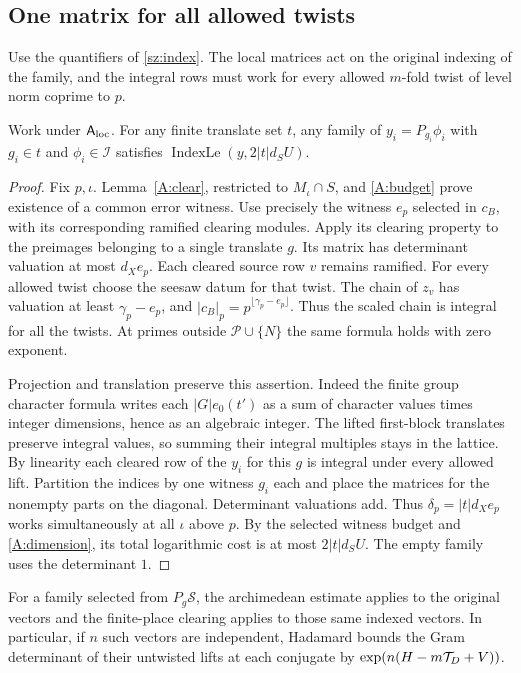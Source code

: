 \subsection{One matrix for all allowed twists}\label{A:indexsec}
Use the quantifiers of \eqref{sz:index}. The local matrices act on the original indexing of the family, and the integral rows must work for every allowed $m$-fold twist of level norm coprime to $p$.

\begin{chatAproposition}[Theorem A(b)]\label{A:index}
Work under $\mathsf A_{\rm loc}$.
For any finite translate set $t$, any family of $y_i=P_{g_i}\phi_i$ with $g_i\in t$ and $\phi_i\in\mathcal I$ satisfies $\operatorname{IndexLe}(y,2|t|d_SU)$.
\end{chatAproposition}
\begin{proof}
Fix $p,\iota$. Lemma~\ref{A:clear}, restricted to $M_\iota\cap S$, and \eqref{A:budget} prove existence of a common error witness. Use precisely the witness $e_p$ selected in $c_B$, with its corresponding ramified clearing modules. Apply its clearing property to the preimages belonging to a single translate $g$. Its matrix has determinant valuation at most $d_Xe_p$. Each cleared source row $v$ remains ramified. For every allowed twist choose the seesaw datum for that twist. The chain of $z_v$ has valuation at least $\gamma_p-e_p$, and $|c_B|_p=p^{\lfloor\gamma_p-e_p\rfloor}$. Thus the scaled chain is integral for all the twists. At primes outside $\mathcal P\cup\{N\}$ the same formula holds with zero exponent.

Projection and translation preserve this assertion. Indeed the finite group character formula writes each $|G|e_0(t')$ as a sum of character values times integer dimensions, hence as an algebraic integer. The lifted first-block translates preserve integral values, so summing their integral multiples stays in the lattice. By linearity each cleared row of the $y_i$ for this $g$ is integral under every allowed lift. Partition the indices by one witness $g_i$ each and place the matrices for the nonempty parts on the diagonal. Determinant valuations add. Thus $\delta_p=|t|d_X e_p$ works simultaneously at all $\iota$ above $p$. By the selected witness budget and \eqref{A:dimension}, its total logarithmic cost is at most $2|t|d_SU$. The empty family uses the determinant $1$.
\end{proof}
For a family selected from $P_g\mathcal S$, the archimedean estimate applies to the original vectors and the finite-place clearing applies to those same indexed vectors. In particular, if $n$ such vectors are independent, Hadamard bounds the Gram determinant of their untwisted lifts at each conjugate by $\exp(n(H-m\mathcal T_D+V))$.

